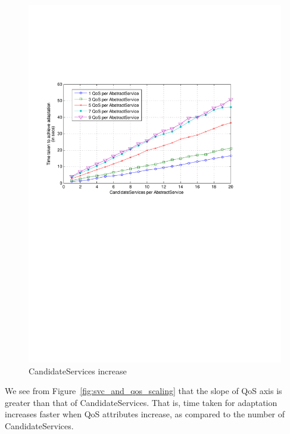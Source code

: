 \documentclass[10pt,journal,compsoc]{IEEEtran}
\begin{document}
\begin{figure}[htbp]
  \centering
  \includegraphics[clip, trim=0cm 14cm 4cm 6cm, scale=0.42]{graphs/1_3_5_7_9_qos_per_svc_scaling.pdf}
  \caption{CandidateServices increase \label{fig:qos_per_svc}}
\end{figure}

We see from Figure~\ref{fig:svc_and_qos_scaling} that the slope of QoS axis is greater than that of CandidateServices. That is, time taken for adaptation increases faster when QoS attributes increase, as compared to the number of CandidateServices.
\end{document}
